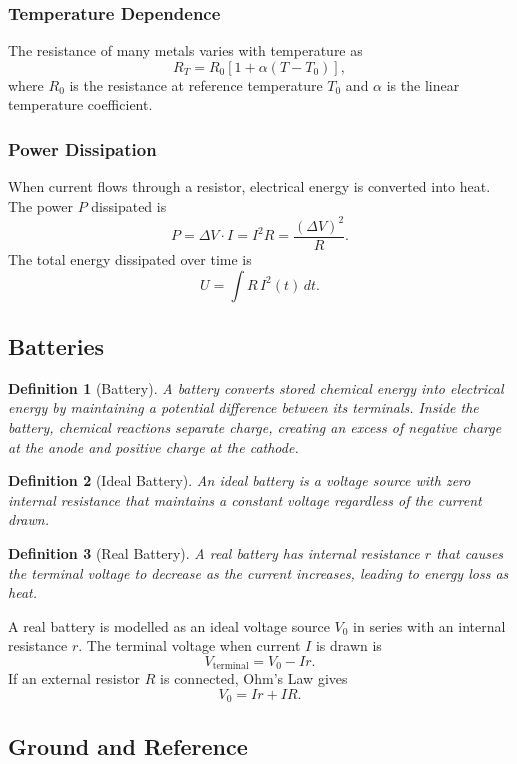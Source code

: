 \documentclass{article}
\newtheorem{definition}{Definition}
\begin{document}
\subsubsection{Temperature Dependence}
The resistance of many metals varies with temperature as
\[R_T = R_0\left[1 + \alpha(T - T_0)\right],\]
where \(R_0\) is the resistance at reference temperature \(T_0\) and \(\alpha\) is the linear temperature coefficient.

\subsubsection{Power Dissipation}
When current flows through a resistor, electrical energy is converted into heat. The power \(P\) dissipated is
\[P = \Delta V \cdot I = I^2 R = \frac{(\Delta V)^2}{R}.\]
The total energy dissipated over time is
\[U = \int R\,I^2(t)\,dt.\]

\subsection{Batteries}

\begin{definition}[Battery]
    A battery converts stored chemical energy into electrical energy by maintaining a potential difference between its terminals. Inside the battery, chemical reactions separate charge, creating an excess of negative charge at the anode and positive charge at the cathode.
\end{definition}
\begin{definition}[Ideal Battery]
    An ideal battery is a voltage source with zero internal resistance that maintains a constant voltage regardless of the current drawn.
\end{definition}
\begin{definition}[Real Battery]
    A real battery has internal resistance $r$ that causes the terminal voltage to decrease as the current increases, leading to energy loss as heat.
\end{definition}

A real battery is modelled as an ideal voltage source \(V_0\) in series with an internal resistance \(r\). The terminal voltage when current \(I\) is drawn is
\[V_{\text{terminal}} = V_0 - Ir.\]
If an external resistor $R$ is connected, Ohm's Law gives
\[V_0 = Ir + IR.\]

\subsection{Ground and Reference}
\end{document}
